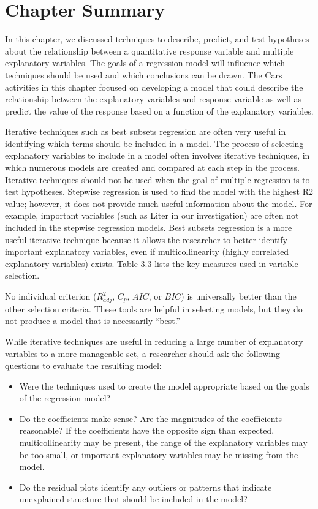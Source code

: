 \documentclass[
]{report}
\providecommand{\tightlist}{%
  \setlength{\itemsep}{0pt}\setlength{\parskip}{0pt}}
\begin{document}
\hypertarget{chapter-summary-2}{%
\section*{\texorpdfstring{\textbf{Chapter Summary}}{Chapter Summary}}\label{chapter-summary-2}}

In this chapter, we discussed techniques to describe, predict, and test hypotheses about the relationship between a quantitative response variable and multiple explanatory variables. The goals of a regression model will influence which techniques should be used and which conclusions can be drawn. The Cars activities in this chapter focused on developing a model that could describe the relationship between the explanatory variables and response variable as well as predict the value of the response based on a function of the explanatory variables.

Iterative techniques such as best subsets regression are often very useful in identifying which terms should be included in a model. The process of selecting explanatory variables to include in a model often involves iterative techniques, in which numerous models are created and compared at each step in the process. Iterative techniques should not be used when the goal of multiple regression is to test hypotheses. Stepwise regression is used to find the model with the highest R2 value; however, it does not provide much useful information about the model. For example, important variables (such as Liter in our investigation) are often not included in the stepwise regression models. Best subsets regression is a more useful iterative technique because it allows the researcher to better identify important explanatory variables, even if multicollinearity (highly correlated explanatory variables) exists. Table 3.3 lists the key measures used in variable selection.

No individual criterion (\(R^2_{adj}\), \(C_p\), \(AIC\), or \(BIC\)) is universally better than the other selection criteria. These tools are helpful in selecting models, but they do not produce a model that is necessarily ``best.''

While iterative techniques are useful in reducing a large number of explanatory variables to a more manageable set, a researcher should ask the following questions to evaluate the resulting model:

\begin{itemize}
\tightlist
\item
  Were the techniques used to create the model appropriate based on the goals of the regression model?
\item
  Do the coefficients make sense? Are the magnitudes of the coefficients reasonable? If the coefficients have the opposite sign than expected, multicollinearity may be present, the range of the explanatory variables may be too small, or important explanatory variables may be missing from the model.
\item
  Do the residual plots identify any outliers or patterns that indicate unexplained structure that should be included in the model?
\end{itemize}
\end{document}
